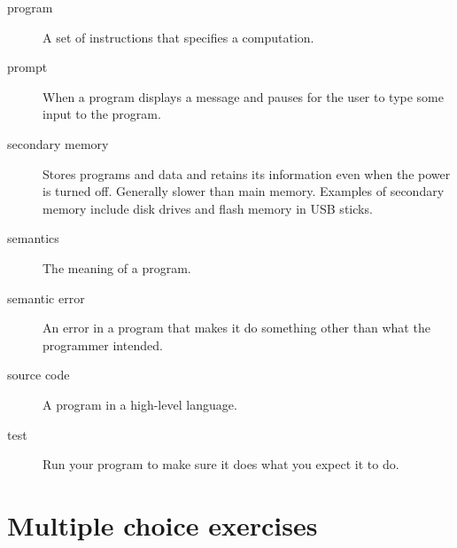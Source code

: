 \begin{description}
\item[program]
A set of instructions that specifies a computation. 
\item[prompt]
When a program displays a message and pauses for the user to type some input to the program. 
\item[secondary memory]
Stores programs and data and retains its information even when the power is turned off. Generally slower than main memory. Examples of secondary memory include disk drives and flash memory in USB sticks.
\item[semantics]
The meaning of a program. 
\item[semantic error]
An error in a program that makes it do something other than what the programmer intended. 
\item[source code]
A program in a high-level language. 
\item[test]
Run your program to make sure it does what you expect it to do.

\end{description}

\hypertarget{ejercicios}{%
\section*{Multiple choice exercises}\label{ejercicios}}


